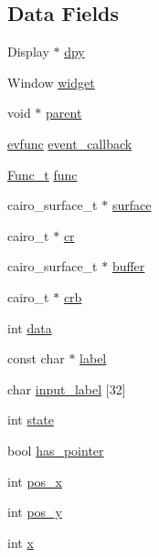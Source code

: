 \subsection*{Data Fields}
\begin{DoxyCompactItemize}
\item 
Display $\ast$ \hyperlink{structWidget__t_a5ae8f0fdd24c6baf15173dc0cc9ae360}{dpy}
\item 
Window \hyperlink{structWidget__t_acb2bfb41674371ee1220a9d6a2d89fb1}{widget}
\item 
void $\ast$ \hyperlink{structWidget__t_a483f6517c19fe09e1bf2eaec6646a14b}{parent}
\item 
\hyperlink{xwidget_8h_ab4ae973f86a383c8c0f92b709044520a}{evfunc} \hyperlink{structWidget__t_ae458a38ef1448056b22d9b42f795669b}{event\+\_\+callback}
\item 
\hyperlink{structFunc__t}{Func\+\_\+t} \hyperlink{structWidget__t_a225b9a175e132994a5aa73b59a2911ad}{func}
\item 
cairo\+\_\+surface\+\_\+t $\ast$ \hyperlink{structWidget__t_ae9b5979742ea31817ff7d7b34a56f88d}{surface}
\item 
cairo\+\_\+t $\ast$ \hyperlink{structWidget__t_a26594f6ffabe98fc08f9207150fc9417}{cr}
\item 
cairo\+\_\+surface\+\_\+t $\ast$ \hyperlink{structWidget__t_a84d225e7b261d67daa764b47c8c62107}{buffer}
\item 
cairo\+\_\+t $\ast$ \hyperlink{structWidget__t_ad98022ee160d4c0906110868fc9e5664}{crb}
\item 
int \hyperlink{structWidget__t_a9dd7b58be77bf31ab021aa627a73186a}{data}
\item 
const char $\ast$ \hyperlink{structWidget__t_a952020107ac1f6d9a37b4f978f77b61c}{label}
\item 
char \hyperlink{structWidget__t_ac5cb454301472edeb16e563ef2149dbb}{input\+\_\+label} \mbox{[}32\mbox{]}
\item 
int \hyperlink{structWidget__t_aaa935b64805fdeb78acb015c67d6638c}{state}
\item 
bool \hyperlink{structWidget__t_ac8c396c698d816afad49fa751c3ca2c8}{has\+\_\+pointer}
\item 
int \hyperlink{structWidget__t_ae2d46ffb30bb2335a043d138fa05e1a3}{pos\+\_\+x}
\item 
int \hyperlink{structWidget__t_a9b127ac6b3f017b367351ee673e063c3}{pos\+\_\+y}
\item 
int \hyperlink{structWidget__t_aac6ce7621b682bb4ce88bac9181c34a7}{x}
\item 

\end{DoxyCompactItemize}
